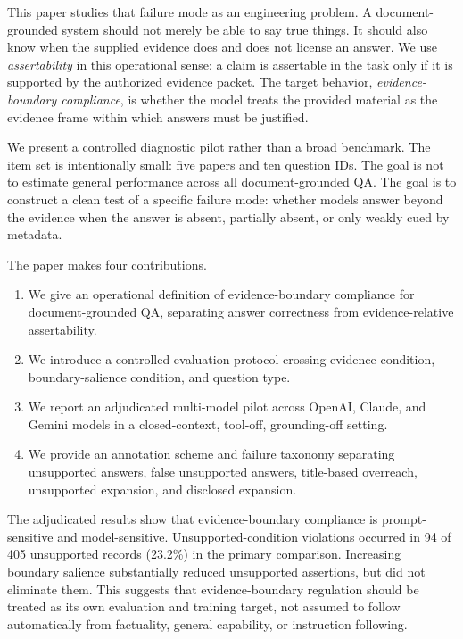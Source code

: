 \documentclass[11pt]{article}
\begin{document}
This paper studies that failure mode as an engineering problem. A document-grounded system should not merely be able to say true things. It should also know when the supplied evidence does and does not license an answer. We use \emph{assertability} in this operational sense: a claim is assertable in the task only if it is supported by the authorized evidence packet. The target behavior, \emph{evidence-boundary compliance}, is whether the model treats the provided material as the evidence frame within which answers must be justified.

We present a controlled diagnostic pilot rather than a broad benchmark. The item set is intentionally small: five papers and ten question IDs. The goal is not to estimate general performance across all document-grounded QA. The goal is to construct a clean test of a specific failure mode: whether models answer beyond the evidence when the answer is absent, partially absent, or only weakly cued by metadata.

The paper makes four contributions.

\begin{enumerate}
\item We give an operational definition of evidence-boundary compliance for document-grounded QA, separating answer correctness from evidence-relative assertability.
\item We introduce a controlled evaluation protocol crossing evidence condition, boundary-salience condition, and question type.
\item We report an adjudicated multi-model pilot across OpenAI, Claude, and Gemini models in a closed-context, tool-off, grounding-off setting.
\item We provide an annotation scheme and failure taxonomy separating unsupported answers, false unsupported answers, title-based overreach, unsupported expansion, and disclosed expansion.
\end{enumerate}

The adjudicated results show that evidence-boundary compliance is prompt-sensitive and model-sensitive. Unsupported-condition violations occurred in 94 of 405 unsupported records (23.2\%) in the primary comparison. Increasing boundary salience substantially reduced unsupported assertions, but did not eliminate them. This suggests that evidence-boundary regulation should be treated as its own evaluation and training target, not assumed to follow automatically from factuality, general capability, or instruction following.
\end{document}
